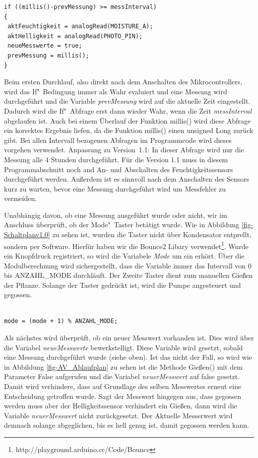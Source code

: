 \begin{lstlisting}[basicstyle=\small]
if ((millis()-prevMessung) >= messInterval)
{
 aktFeuchtigkeit = analogRead(MOISTURE_A);
 aktHelligkeit = analogRead(PHOTO_PIN);
 neueMesswerte = true; 
 prevMessung = millis();
}
\end{lstlisting}

Beim ersten Durchlauf, also direkt nach dem Anschalten des Mikrocontrollers, wird das If"~Bedingung immer als Wahr evaluiert und eine Messung wird durchgeführt und die Variable \emph{prevMessung} wird auf die aktuelle Zeit eingestellt. Dadurch wird die If"~Abfrage erst dann wieder Wahr, wenn die Zeit \emph{messInterval} abgelaufen ist. Auch bei einem Überlauf der Funktion millis() wird diese Abfrage ein korrektes Ergebnis liefen, da die Funktion millis() einen unsigned Long zurück gibt. Bei allen Intervall bezogenen Abfragen im Programmcode wird dieses vorgehen verwendet. 
Anpassung zu Version~1.1: In dieser Abfrage wird nur die Messung alle 4 Stunden durchgeführt. Für die Version 1.1 muss in diesem Programmabschnitt noch and An- und Abschalten des Feuchtigkeitssensors durchgeführt werden. Außerdem ist es sinnvoll nach dem Anschalten des Sensors kurz zu warten, bevor eine Messung durchgeführt wird um Messfehler zu vermeiden.

Unabhängig davon, ob eine Messung ausgeführt wurde oder nicht, wir im Anschluss überprüft, ob der Mode"~Taster betätigt wurde. Wie in Abbildung \ref{fig-Schaltplanv1.0} zu sehen ist, wurden die Taster nicht über Kondensator entprellt, sondern per Software. Hierfür haben wir die Bounce2 Libary verwendet\footnote{http://playground.arduino.cc/Code/Bounce}. Wurde ein Knopfdruck registriert, so wird die Variabele \emph{Mode} um ein erhört. Über die Modulberechnung wird sichergestellt, dass die Variable immer das Intervall von 0 bis ANZAHL\_MODE durchläuft. Der Zweite Taster dient zum manuellen Gießen der Pflanze. Solange der Taster gedrückt ist, wird die Pumpe angesteuert und gegossen. 

\begin{lstlisting}[basicstyle=\small]

mode = (mode + 1) % ANZAHL_MODE;

\end{lstlisting}

Als nächstes wird überprüft, ob ein neuer Messwert vorhanden ist. Dies wird über die Variabel \emph{neueMesswerte} bewerkstelligt. Diese Variable wird gesetzt, sobald eine Messung durchgeführt wurde (siehe oben). Ist das nicht der Fall, so wird wie in Abbildung \ref{fig-AV_Ablaufplan} zu sehen ist die Methode Gießen() mit dem Parameter False aufgerufen und die Variabel \emph{neuerMesswert} auf false gesetzt. Damit wird verhindere, dass auf Grundlage des selben Messwertes erneut eine Entscheidung getroffen wurde. Sagt der Messwert hingegen aus, dass gegossen werden muss aber der Helligkeitssensor verhindert ein Gießen, dann wird die Variable \emph{neuerMesswert} nicht zurückgesetzt. Der Aktuelle Messerwert wird demnach solange abgeglichen, bis es hell genug ist, damit gegossen werden kann.

